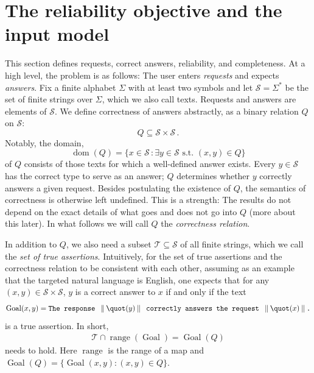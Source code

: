 \documentclass[11pt,twoside]{article}
\theoremstyle{definition}
\newcommand{\Stext}{\mathcal S}
\newcommand{\True}{\mathcal T}
\newcommand{\Goal}{\operatorname{Goal}}
\newcommand{\dom}{\operatorname{dom}}
\newcommand{\range}{\operatorname{range}}
\newcommand{\cat}{\mathbin{\Vert}}
\begin{document}
\section{The reliability objective and the input model}
\label{sec:problem}

This section defines requests, correct answers, reliability, and completeness.
At a high level, the problem is as follows:
The user enters \emph{requests} and expects \emph{answers}. Fix a finite
alphabet $\Sigma$ with at least two symbols and let
$\Stext=\Sigma^*$ be the set of finite strings over $\Sigma$,
which we also call texts. Requests and answers are elements of $\Stext$. We
define correctness of answers abstractly, as a binary relation $Q$ on
$\Stext$:
\[
Q \subseteq \Stext \times \Stext\,.
\]
Notably, the domain,
\[
\dom(Q) = \{ x\in \Stext \,: \exists y\in \Stext \textrm{ s.t. } (x,y)\in Q \}
\]
of $Q$ consists of those texts for which a well-defined answer exists.
Every $y\in\Stext$ has the correct type to serve as an answer; $Q$ determines
whether $y$ correctly answers a given request.
Besides postulating the existence of $Q$,
the semantics of correctness is otherwise left undefined.
This is a strength: The results do not depend on the exact details of what goes and
does not go into $Q$ (more about this later).
In what follows we will call $Q$ the \emph{correctness relation}.

In addition to $Q$, we also need a subset $\True\subseteq \Stext$ of all finite strings,
which we call the \emph{set of true assertions}.
Intuitively, for
the set of true assertions and the correctness relation
to be consistent with each other,
assuming as an example that the targeted natural language is English,
one expects that for any $(x,y)\in \Stext\times\Stext$,
$y$ is a correct answer to $x$ if and only if the text
\begin{equation}
\Goal(x,y)=\text{\ttfamily The response }\cat\quot(y)\cat
 \text{\ttfamily\ correctly answers the request }\cat\quot(x)\cat\text{\ttfamily .}
\label{eq:goal}
\end{equation}
is a true assertion. In short,
\begin{align}
\True \cap \range(\Goal) = \Goal(Q)
\label{eq:goal-meaning}
\end{align}
needs to hold. Here $\range$ is the range of a map and
$\Goal(Q)=\{\Goal(x,y):(x,y)\in Q\}$.
\end{document}

